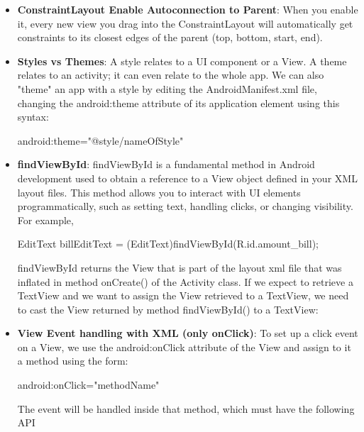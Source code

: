 \documentclass{report}
\begin{document}
\begin{itemize}
\begin{itemize}
            \end{itemize}
        \item \textbf{ConstraintLayout Enable Autoconnection to Parent}: When you enable it, every new view you drag into the ConstraintLayout will automatically get constraints to its closest edges of the parent (top, bottom, start, end).
        \item \textbf{Styles vs Themes}: A style relates to a UI component or a View. A theme relates to an activity; it can even relate to the whole app.
            \bigbreak \noindent 
            We can also "theme" an app with a style by editing the AndroidManifest.xml file, changing the android:theme attribute of its application element using this syntax:
            \bigbreak \noindent 
            \begin{xmlcode}
                android:theme="@style/nameOfStyle"
            \end{xmlcode}
        \item \textbf{findViewById}: findViewById is a fundamental method in Android development used to obtain a reference to a View object defined in your XML layout files. This method allows you to interact with UI elements programmatically, such as setting text, handling clicks, or changing visibility.
            \bigbreak \noindent 
            For example,
            \bigbreak \noindent
            \begin{javacode}
            EditText billEditText = (EditText)findViewById(R.id.amount_bill);
            \end{javacode}
            \bigbreak \noindent 
            findViewById returns the View that is part of the layout xml file that was inflated in method onCreate() of the Activity class.
            \bigbreak \noindent 
            If we expect to retrieve a TextView and we want to assign the View retrieved to a TextView, we need to cast the View returned by method findViewById() to a TextView:
        \item \textbf{View Event handling with XML (only onClick)}: To set up a click event on a View, we use the android:onClick attribute of the View and assign to it a method using the form:
            \bigbreak \noindent 
            \begin{xmlcode}
            android:onClick="methodName"
            \end{xmlcode}
            \bigbreak \noindent 
            The event will be handled inside that method, which must have the following API
            \bigbreak \noindent 

\end{itemize}
\end{document}
